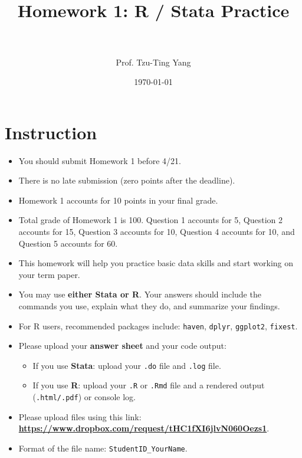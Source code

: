 \documentclass[paper=a4, fontsize=11pt]{scrartcl} %
\title{
\normalfont \normalsize
\horrule{0.5pt} \\[0.4cm]
\huge Homework 1: R / Stata Practice \\
\horrule{2pt} \\[0.5cm]
}
\author{Prof. Tzu-Ting Yang}
\date{\normalsize\today}
\begin{document}
\maketitle


\section*{Instruction}
\begin{itemize}
\item[\textbullet] You should submit Homework 1 before 4/21.
\item[\textbullet] There is no late submission (zero points after the deadline).
\item[\textbullet] Homework 1 accounts for 10 points in your final grade.
\item[\textbullet] Total grade of Homework 1 is 100. Question 1 accounts for 5, Question 2 accounts for 15, Question 3 accounts for 10, Question 4 accounts for 10, and Question 5 accounts for 60.
\item[\textbullet] This homework will help you practice basic data skills and start working on your term paper.
\item[\textbullet] You may use \textbf{either Stata or R}. Your answers should include the commands you use, explain what they do, and summarize your findings.
\item[\textbullet] For R users, recommended packages include: \texttt{haven}, \texttt{dplyr}, \texttt{ggplot2}, \texttt{fixest}.
\item[\textbullet] Please upload your \textbf{answer sheet} and your code output:
\begin{itemize}
\item If you use \textbf{Stata}: upload your \texttt{.do} file and \texttt{.log} file.
\item If you use \textbf{R}: upload your \texttt{.R} or \texttt{.Rmd} file and a rendered output (\texttt{.html/.pdf}) or console log.
\end{itemize}
\item[\textbullet] Please upload files using this link: \\ \textbf{\url{https://www.dropbox.com/request/tHC1fXI6jlvN060Oezs1}}.
\item[\textbullet] Format of the file name: \texttt{StudentID\_YourName}.
\end{itemize}
\end{document}
